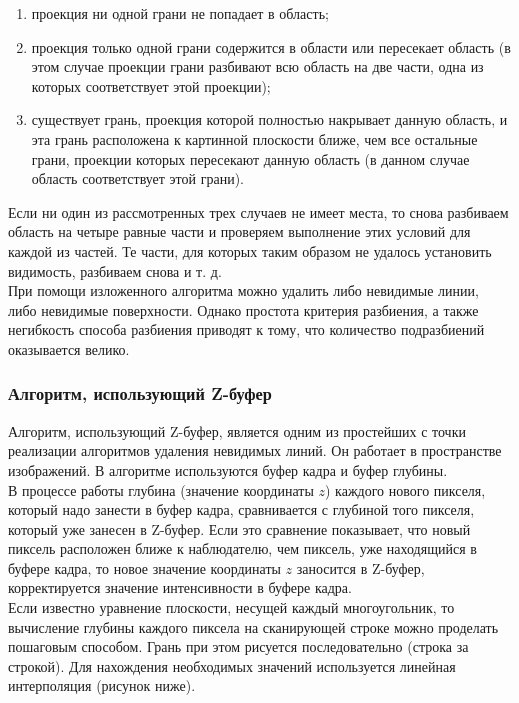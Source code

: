 \begin{enumerate}
	\item проекция ни одной грани не попадает в область;
	\item проекция только одной грани содержится в области или пересекает область (в этом случае проекции грани разбивают всю область на две части, одна из которых соответствует этой проекции);
	\item существует грань, проекция которой полностью накрывает данную область, и эта грань расположена к картинной плоскости ближе, чем все остальные грани, проекции которых пересекают данную область (в данном случае область соответствует этой грани).
\end{enumerate}

Если ни один из рассмотренных трех случаев не имеет места, то снова разбиваем область на четыре равные части и проверяем выполнение этих условий для каждой из частей. Те части, для которых таким образом не удалось установить видимость, разбиваем снова и т. д.\\

При помощи изложенного алгоритма можно удалить либо невидимые линии, либо невидимые поверхности. Однако простота критерия разбиения, а также негибкость способа разбиения приводят к тому, что количество подразбиений оказывается велико.

\subsubsection{Алгоритм, использующий Z-буфер}\label{subsec:analytic1.1.3}

Алгоритм, использующий Z-буфер, является одним из простейших с точки реализации алгоритмов удаления невидимых линий. Он работает в пространстве изображений. В алгоритме используются буфер кадра и буфер глубины.\\

В процессе работы глубина (значение координаты $z$) каждого нового пикселя, который надо занести в буфер кадра, сравнивается с глубиной того пикселя, который уже занесен в Z-буфер. Если это сравнение показывает, что новый пиксель расположен ближе к наблюдателю, чем пиксель, уже находящийся в буфере кадра, то новое значение координаты $z$ заносится в Z-буфер, корректируется значение интенсивности в буфере кадра.\\

Если известно уравнение плоскости, несущей каждый многоугольник, то вычисление глубины каждого пиксела на сканирующей строке можно проделать пошаговым способом. Грань при этом рисуется последовательно (строка за строкой). Для нахождения необходимых значений используется линейная интерполяция (рисунок ниже).

